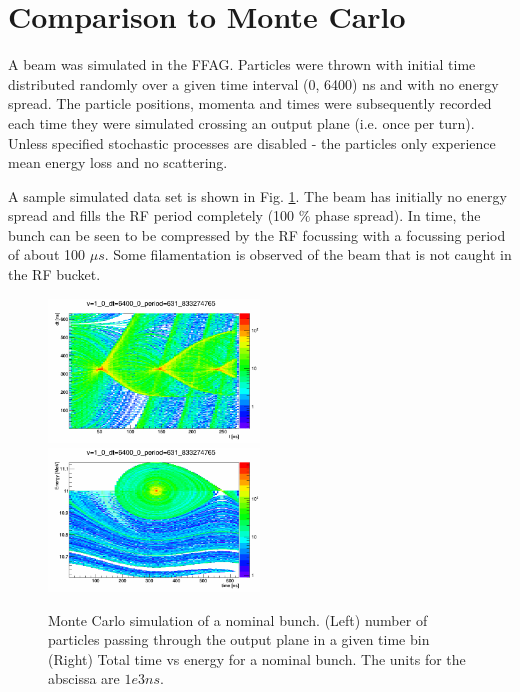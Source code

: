 \documentclass{paper}
\begin{document}
\section{Comparison to Monte Carlo}
\label{sec:mc}
A beam was simulated in the FFAG. Particles were thrown with initial 
time distributed randomly over a given time interval (0, 6400) ns and with no 
energy spread. The particle positions, momenta and times were subsequently 
recorded each time they were simulated crossing an output plane (i.e. once per 
turn). Unless specified stochastic processes are disabled - the particles only
experience mean energy loss and no scattering.

A sample simulated data set is shown in Fig. \ref{fig:nominal_mc}. The beam has
initially no energy spread and fills the RF period completely (100 $\%$ phase
spread). In time, the bunch can be seen to be compressed by the RF focussing with
a focussing period of about 100 $\mu s$. Some filamentation is observed of the
beam that is not caught in the RF bucket.

\begin{figure}
		\includegraphics[width=0.5\textwidth]{images/time_vs_dt_v=1_0_dt=6400_0_period=631_833274765}
		\includegraphics[width=0.5\textwidth]{images/time_vs_energy_v=1_0_dt=6400_0_period=631_833274765}
	\caption{Monte Carlo simulation of a nominal bunch. (Left) number of particles
           passing through the output plane in a given time bin (Right) Total 
           time vs energy for a nominal bunch. The units for the abscissa are
           $1e3 ns$.}
	\label{fig:nominal_mc}
\end{figure}
\end{document}
